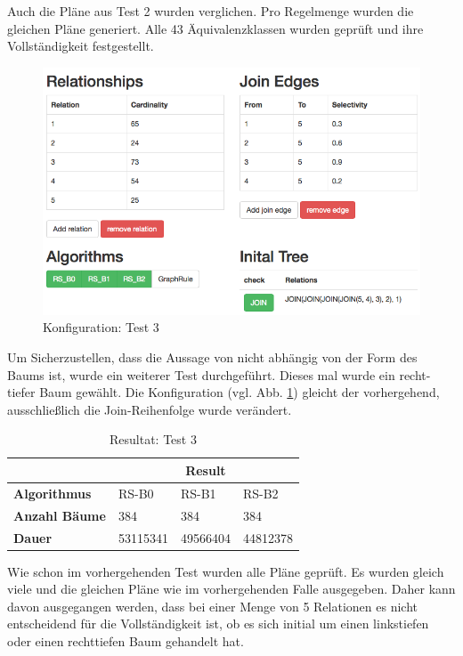 Auch die Pläne aus Test 2 wurden verglichen. Pro Regelmenge wurden die gleichen Pläne generiert. Alle 43 Äquivalenzklassen wurden geprüft und ihre Vollständigkeit festgestellt.

\begin{figure}[ht]
  \centering
  \includegraphics[width=\textwidth]{05_ResultsEvaluation/00_media/Test3.png}
  \caption{Konfiguration: Test 3}
  \label{Konfiguration:Test3}
\end{figure}


Um Sicherzustellen, dass die Aussage von \cite{shanbhag2014optimizing} nicht abhängig von der Form des Baums ist, wurde ein weiterer Test durchgeführt. Dieses mal wurde ein recht-tiefer Baum gewählt. Die Konfiguration (vgl. Abb. \ref{Konfiguration:Test3}) gleicht der vorhergehend, ausschließlich die Join-Reihenfolge wurde verändert.

\begin{table}[h]
\centering
\begin{tabular}{|l|l|l|l|}
\hline
                         & \multicolumn{3}{c|}{{\bf Result}} \\ \hline
{\bf Algorithmus}        & RS-B0     & RS-B1     & RS-B2     \\ \hline
{\bf Anzahl Bäume}       & 384       & 384       & 384       \\ \hline
{\bf Dauer}              & 53115341  & 49566404  & 44812378  \\ \hline
\end{tabular}

\caption{Resultat: Test 3}
\label{Result:Test3}
\end{table}


Wie schon im vorhergehenden Test wurden alle Pläne geprüft. Es wurden gleich viele und die gleichen Pläne wie im vorhergehenden Falle ausgegeben. Daher kann davon ausgegangen werden, dass bei einer Menge von 5 Relationen es nicht entscheidend für die Vollständigkeit ist, ob es sich initial um einen linkstiefen oder einen rechttiefen Baum gehandelt hat.



